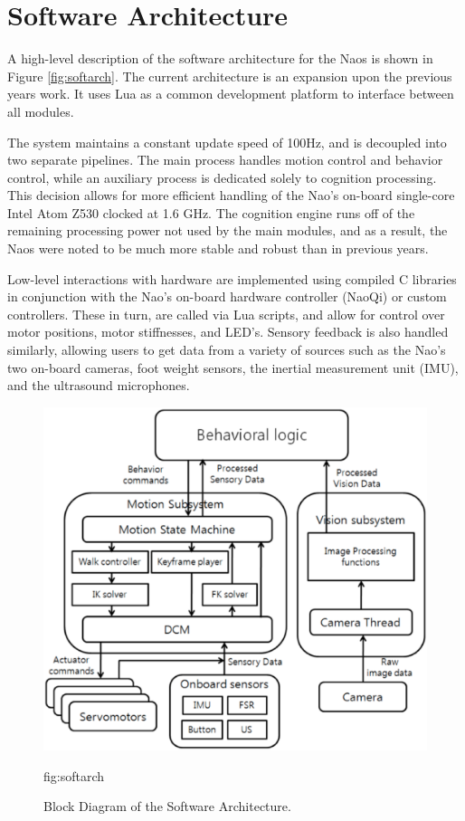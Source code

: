 \documentclass{article}
\begin{document}
\section{Software Architecture}
	A high-level description of the software architecture for the Naos is shown in Figure \ref{fig:softarch}. The current architecture is an expansion upon the previous years work. It uses Lua as a common development platform to interface between all modules.

	The system maintains a constant update speed of 100Hz, and is decoupled into two separate pipelines. The main process handles motion control and behavior control, while an auxiliary process is dedicated solely to cognition processing. This decision allows for more efficient handling of the Nao's on-board single-core Intel Atom Z530 clocked at 1.6 GHz. The cognition engine runs off of the remaining processing power not used by the main modules, and as a result, the Naos were noted to be much more stable and robust than in previous years.

	Low-level interactions with hardware are implemented using compiled C libraries in conjunction with the Nao's on-board hardware controller (NaoQi) or custom controllers. These in turn, are called via Lua scripts, and allow for control over motor positions, motor stiffnesses, and LED's. Sensory feedback is also handled similarly, allowing users to get data from a variety of sources such as the Nao's two on-board cameras, foot weight sensors, the inertial measurement unit (IMU), and the ultrasound microphones.

	\begin{figure}[H]
		\centering
		\includegraphics[width=1.0\textwidth]{figures/SoftArchOverview.eps}
		\caption{Block Diagram of the Software Architecture.}
		\label{}{fig:softarch}
	\end{figure}
\end{document}
